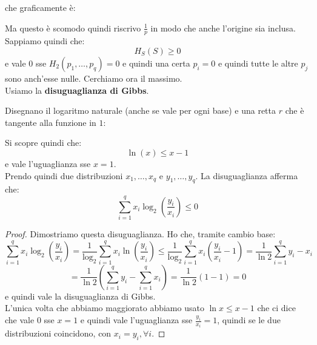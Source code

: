 \documentclass[a4paper,12pt, oneside]{book}
\begin{document}
che graficamente è:
\begin{figure}[H]
  \centering
\end{figure}
Ma questo è scomodo quindi riscrivo $\frac{1}{p}$ in modo che anche l'origine
sia inclusa. \\
Sappiamo quindi che:
\[H_S(S)\geq 0\]
e vale 0 sse $H_2(p_1,\ldots, p_q)=0$ e quindi una certa $p_i=0$ e quindi tutte
le altre $p_j$ sono anch'esse nulle.
Cerchiamo ora il massimo.\\
Usiamo la \textbf{disuguaglianza di Gibbs}.
\begin{teorema}
  Disegnano il logaritmo naturale (anche se vale per ogni base) e
  una retta $r$ che è tangente alla funzione in $1$:
  \begin{figure}[H]
    \centering
  \end{figure}
  Si scopre quindi che:
  \[\ln (x)\leq x-1\]
  e vale l'uguaglianza sse $x=1$.\\
  Prendo quindi due distribuzioni $x_1,\ldots, x_q$ e $y_1,\ldots, y_q$. La
  disuguaglianza afferma che:
  \[\sum_{i=1}^q x_i\log_2\left(\frac{y_i}{x_i}\right)\leq 0\]
\end{teorema}
\begin{proof}
  Dimostriamo questa disuguaglianza. Ho che, tramite cambio base:
  \[\sum_{i=1}^q
    x_i\log_2\left(\frac{y_i}{x_i}\right)=\frac{1}{\log_2}\sum_{i=1}^q
    x_i\ln\left(\frac{y_i}{x_i}\right)\leq \frac{1}{\log_2}\sum_{i=1}^q
    x_i\left(\frac{y_i}{x_i}-1\right)=\frac{1}{\ln 2}\sum_{i=1}^q y_i-x_i\]
  \[=\frac{1}{\ln 2}\left(\sum_{i=1}^q y_i-\sum_{i=1}^q x_i\right)=\frac{1}{\ln
      2}(1-1)=0\]
  e quindi vale la disuguaglianza di Gibbs.\\
  L'unica volta che abbiamo maggiorato abbiamo usato $\ln x\leq x-1$ che ci
  dice che vale $0$ sse  $x=1$ e quindi vale l'uguaglianza sse
  $\frac{y_i}{x_i}=1$, quindi se le due distribuzioni coincidono, con
  $x_i=y_i,\forall i$.
\end{proof}
\end{document}

